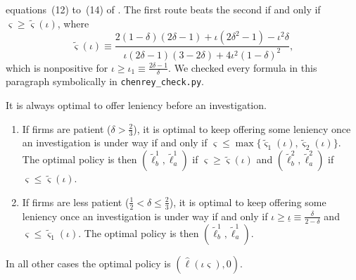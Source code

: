 equations~(12) to~(14) of \citet{ChenRey2013}. The first route beats the second if and only if
$\varsigma \ge \tilde\varsigma(\iota)$, where
\begin{equation}\label{eq:12-cr-ptilde}
\tilde\varsigma(\iota) \equiv \frac{2(1-\delta)(2\delta - 1) + \iota(2\delta^2 - 1) - \iota^2\delta}
{\iota(2\delta - 1)(3 - 2\delta) + 4\iota^2(1-\delta)^2},
\end{equation}
which is nonpositive for $\iota \ge \iota_1 \equiv \frac{2\delta - 1}{\delta}$. We checked every formula in this
paragraph symbolically in \texttt{chenrey\_check.py}.

\begin{proposition}\label{prop:12-cr-open}
It is always optimal to offer leniency before an investigation.
\begin{enumerate}[label=(\alph*)]
\item If firms are patient ($\delta > \frac{2}{3}$), it is optimal to keep offering some leniency once an investigation
is under way if and only if $\varsigma \le \max\{\tilde\varsigma_1(\iota), \tilde\varsigma_2(\iota)\}$. The optimal
policy is then $(\tilde\ell_b^1, \tilde\ell_a^1)$ if $\varsigma \ge \tilde\varsigma(\iota)$ and
$(\tilde\ell_b^2, \tilde\ell_a^2)$ if $\varsigma \le \tilde\varsigma(\iota)$.
\item If firms are less patient ($\frac{1}{2} < \delta \le \frac{2}{3}$), it is optimal to keep offering some leniency
once an investigation is under way if and only if $\iota \ge \underline\iota \equiv \frac{\delta}{2-\delta}$ and
$\varsigma \le \tilde\varsigma_1(\iota)$. The optimal policy is then $(\tilde\ell_b^1, \tilde\ell_a^1)$.
\end{enumerate}
In all other cases the optimal policy is $(\hat\ell(\iota\varsigma), 0)$.
\end{proposition}

